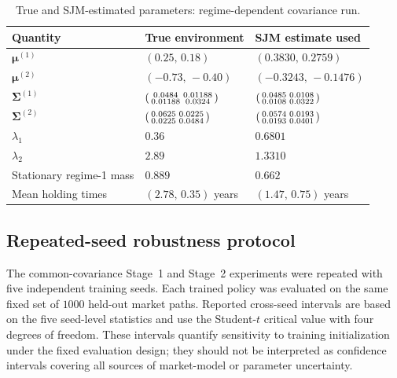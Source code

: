 \documentclass[a4paper,10pt]{article}
\newcommand{\bmu}{\bm{\mu}}
\newcommand{\bSigma}{\bm{\Sigma}}
\begin{document}
\begin{table}[H]
\centering
\small
\caption{True and SJM-estimated parameters: regime-dependent covariance run.}
\label{tab:regcov_parameters}
\begin{tabular}{>{\raggedright\arraybackslash}p{} >{\raggedright\arraybackslash}p{} >{\raggedright\arraybackslash}p{}}
\toprule
Quantity & True environment & SJM estimate used \\
\midrule
$\bmu^{(1)}$ & $(0.25,\,0.18)$ & $(0.3830,\,0.2759)$ \\
$\bmu^{(2)}$ & $(-0.73,\,-0.40)$ & $(-0.3243,\,-0.1476)$ \\
$\bSigma^{(1)}$ & $\begin{psmallmatrix}0.0484&0.01188\\0.01188&0.0324\end{psmallmatrix}$ & $\begin{psmallmatrix}0.0485&0.0108\\0.0108&0.0322\end{psmallmatrix}$ \\
$\bSigma^{(2)}$ & $\begin{psmallmatrix}0.0625&0.0225\\0.0225&0.0484\end{psmallmatrix}$ & $\begin{psmallmatrix}0.0574&0.0193\\0.0193&0.0401\end{psmallmatrix}$ \\
$\lambda_1$ & $0.36$ & $0.6801$ \\
$\lambda_2$ & $2.89$ & $1.3310$ \\
Stationary regime-1 mass & $0.889$ & $0.662$ \\
Mean holding times & $(2.78,\,0.35)$ years & $(1.47,\,0.75)$ years \\
\bottomrule
\end{tabular}
\end{table}

\subsection{Repeated-seed robustness protocol}

The common-covariance Stage~1 and Stage~2 experiments were repeated with five independent training seeds. Each trained policy was evaluated on the same fixed set of $1000$ held-out market paths. Reported cross-seed intervals are based on the five seed-level statistics and use the Student-$t$ critical value with four degrees of freedom. These intervals quantify sensitivity to training initialization under the fixed evaluation design; they should not be interpreted as confidence intervals covering all sources of market-model or parameter uncertainty.
\end{document}
